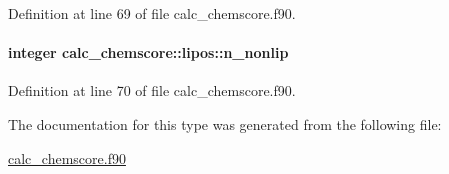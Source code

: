 Definition at line 69 of file calc\-\_\-chemscore.\-f90.

\hypertarget{structcalc__chemscore_1_1lipos_a341243244ff5b54613d2c4f3a0900129}{
\paragraph[{n\-\_\-nonlip}]{\setlength{\rightskip}{0pt plus 5cm}integer calc\-\_\-chemscore\-::lipos\-::n\-\_\-nonlip}}\label{structcalc__chemscore_1_1lipos_a341243244ff5b54613d2c4f3a0900129}


Definition at line 70 of file calc\-\_\-chemscore.\-f90.



The documentation for this type was generated from the following file\-:\begin{DoxyCompactItemize}
\item 
\hyperlink{calc__chemscore_8f90}{calc\-\_\-chemscore.\-f90}\end{DoxyCompactItemize}
